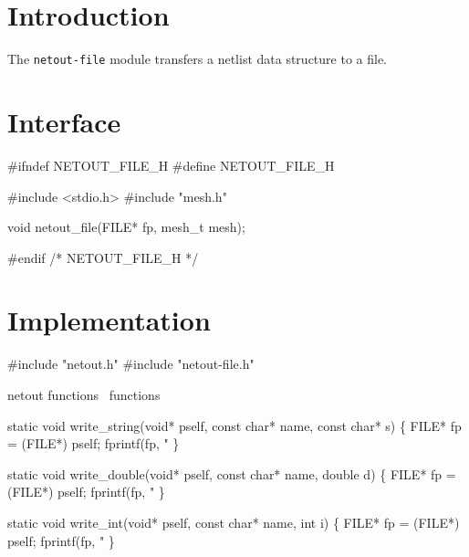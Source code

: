 
\section{Introduction}

The {\tt{}netout-file} module transfers a netlist data structure to
a file.


\section{Interface}

\endmoddef
#ifndef NETOUT_FILE_H
#define NETOUT_FILE_H

#include <stdio.h>
#include "mesh.h"

void netout_file(FILE* fp, mesh_t mesh);

#endif /* NETOUT_FILE_H */
\nwendcode{}\nwdocspar


\section{Implementation}

\nwenddocs{}\endmoddef
#include "netout.h"
#include "netout-file.h"

\LA{}\code{}netout\edoc{} functions~{\nwtagstyle{}}\RA{}
\LA{}functions~{\nwtagstyle{}}\RA{}
\nwendcode{}\nwdocspar

\nwenddocs{}\endmoddef
static void write_string(void* pself, const char* name, const char* s)
\{
    FILE* fp = (FILE*) pself;
    fprintf(fp, "  %
\}

static void write_double(void* pself, const char* name, double d)
\{
    FILE* fp = (FILE*) pself;
    fprintf(fp, "  %
\}

static void write_int(void* pself, const char* name, int i)
\{
    FILE* fp = (FILE*) pself;
    fprintf(fp, "  %
\}

